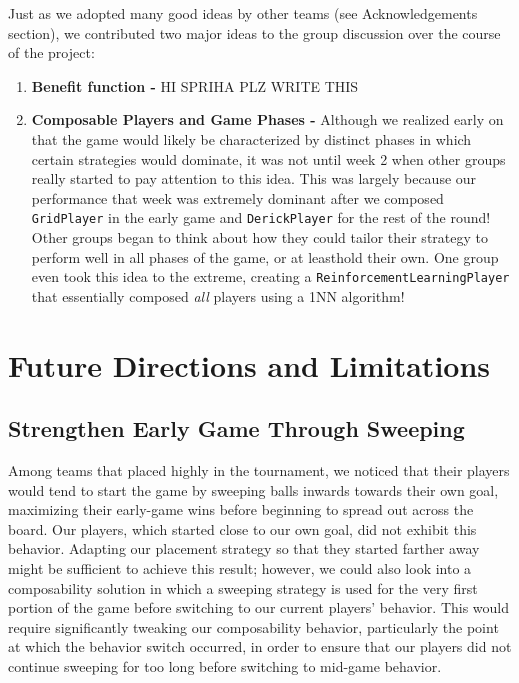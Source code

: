 \documentclass[
10pt, %
letterpaper, %
oneside, %
headinclude,footinclude, %
english
]{article}
\begin{document}
Just as we adopted many good ideas by other teams (see Acknowledgements section), we contributed two major ideas to the group discussion over the course of the project:

\begin{enumerate}
  \item \textbf{Benefit function - } HI SPRIHA PLZ WRITE THIS
  \item \textbf{Composable Players and Game Phases - } Although we realized early on that the game would likely be characterized by distinct phases in which certain strategies would dominate, it was not until week 2 when other groups really started to pay attention to this idea. This was largely because our performance that week was extremely dominant after we composed \texttt{GridPlayer} in the early game and \texttt{DerickPlayer} for the rest of the round! Other groups began to think about how they could tailor their strategy to perform well in all phases of the game, or at leasthold their own. One group even took this idea to the extreme, creating a \texttt{ReinforcementLearningPlayer} that essentially composed \textit{all} players using a 1NN algorithm!
\end{enumerate}

\section{Future Directions and Limitations}

\subsection{Strengthen Early Game Through Sweeping}
Among teams that placed highly in the tournament, we noticed that their players would tend to start the game by sweeping balls inwards towards their own goal, maximizing their early-game wins before beginning to spread out across the board. Our players, which started close to our own goal, did not exhibit this behavior. Adapting our placement strategy so that they started farther away might be sufficient to achieve this result; however, we could also look into a composability solution in which a sweeping strategy is used for the very first portion of the game before switching to our current players' behavior. This would require significantly tweaking our composability behavior, particularly the point at which the behavior switch occurred, in order to ensure that our players did not continue sweeping for too long before switching to mid-game behavior.
\end{document}
